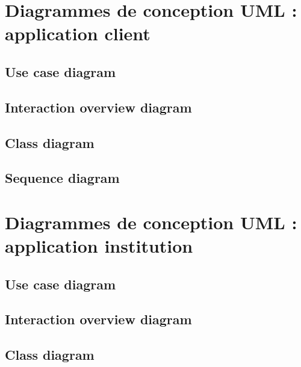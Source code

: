 \documentclass[]{report}
\begin{document}
\section{Diagrammes de conception UML : application client}



\subsection{Use case diagram}

\newpage

\subsection{Interaction overview diagram}

\newpage

\subsection{Class diagram}

\newpage

\subsection{Sequence diagram}

\newpage



\section{Diagrammes de conception UML : application institution}



\subsection{Use case diagram}

\newpage

\subsection{Interaction overview diagram}

\newpage

\subsection{Class diagram}

\newpage
\end{document}
